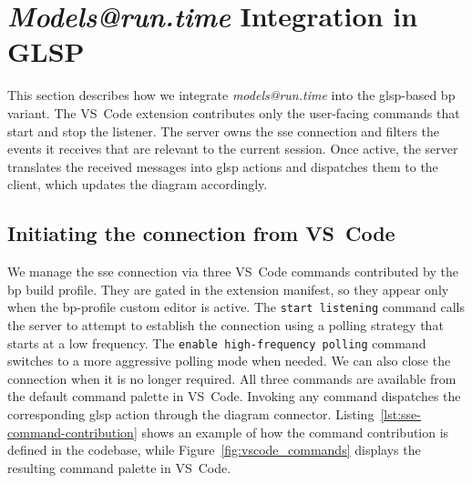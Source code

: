 \section{\textit{Models@run.time} Integration in GLSP}
\label{sec:impl_glsp_models_runtime}

This section describes how we integrate \textit{models@run.time} into the \gls{glsp}-based \gls{bp} variant.
The VS~Code extension contributes only the user-facing commands that start and stop the listener.
The server owns the \gls{sse} connection and filters the events it receives that are relevant to the current session.
Once active, the server translates the received messages into \gls{glsp} actions and dispatches them to the client, which updates the diagram accordingly.

\subsection{Initiating the connection from VS~Code}
\label{subsec:impl_glsp_models_runtime_vscode_commands}

We manage the \gls{sse} connection via three VS~Code commands contributed by the \gls{bp} build profile.
They are gated in the extension manifest, so they appear only when the \gls{bp}-profile custom editor is active.
The \texttt{start listening} command calls the server to attempt to establish the connection using a polling strategy that starts at a low frequency.
The \texttt{enable high-frequency polling} command switches to a more aggressive polling mode when needed.
We can also close the connection when it is no longer required.
All three commands are available from the default command palette in VS~Code.
Invoking any command dispatches the corresponding \gls{glsp} action through the diagram connector.
Listing~\ref{lst:sse-command-contribution} shows an example of how the command contribution is defined in the codebase, while Figure~\ref{fig:vscode_commands} displays the resulting command palette in VS~Code.



